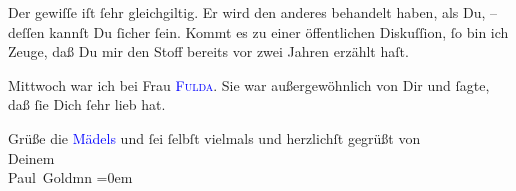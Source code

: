 \pstart
           Der gewiſſe \label{K_L03094-112v}\label{K_L03094-112h}
                iſt ſehr {\pb}gleichgiltig. Er wird den \label{K_L03094-43v}\label{K_L03094-43h} anderes behandelt haben, als Du, – deſſen kannſt Du ſicher ſein. Kommt es zu
               einer öffentlichen Diskuſſion, ſo bin ich Zeuge, daß Du mir den Stoff bereits vor
               zwei Jahren erzählt haſt.\pend
           
\pstart
           Mittwoch war ich bei Frau \textsc{\textcolor{blue}{Fulda}{}\ledrightnote{\textcolor{blue}{Ida d’Albert}}}. Sie war außergewöhnlich \label{K_L03094-44v}\label{K_L03094-44h} von
               Dir und ſagte, daß ſie Dich ſehr lieb hat.\pend
           
\pstart
           \label{K_L03094-32v}\label{K_L03094-32h}\pend
           
\pstart
           Grüße die \textcolor{blue}{Mädels}{}\ledrightnote{{$\rightarrow$}\textcolor{blue}{Olga Schnitzler}{\newline}{$\rightarrow$}\textcolor{blue}{Elisabeth Steinrück}} und ſei ſelbſt vielmals und herzlichſt gegrüßt von {\\[\baselineskip]}Deinem {\\[\baselineskip]}\spacefill\mbox{Paul Goldmn}\pend
           \leftskip=0em{}\endnumbering{}
\begin{anhang}
\end{anhang}
      